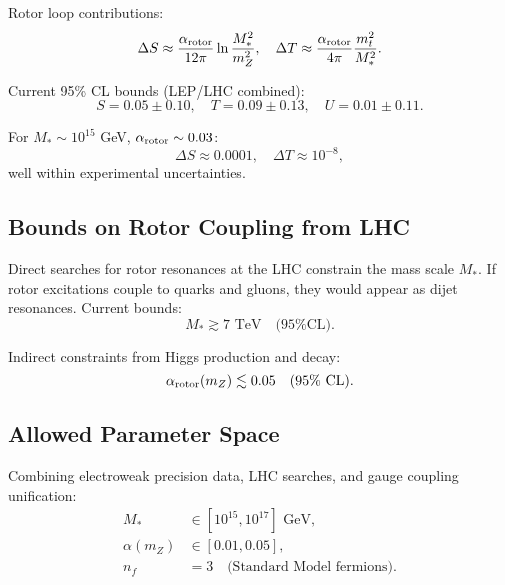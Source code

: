 \documentclass[11pt,a4paper]{article}
\numberwithin{equation}{section}
\theoremstyle{plain}
\theoremstyle{definition}
\theoremstyle{remark}
\begin{document}
Rotor loop contributions:
\begin{equation}
\Delta S \approx \frac{\alpha_{\rm rotor}}{12\pi}\ln\frac{M_*^2}{m_Z^2}, \quad \Delta T \approx \frac{\alpha_{\rm rotor}}{4\pi}\frac{m_t^2}{M_*^2}.
\label{eq:STU-rotor}
\end{equation}

Current 95\% CL bounds (LEP/LHC combined):
\begin{equation}
S = 0.05\pm 0.10, \quad T = 0.09\pm 0.13, \quad U = 0.01\pm 0.11.
\label{eq:STU-exp}
\end{equation}

For $M_*\sim 10^{15}$ GeV, $\alpha_{\rm rotor}\sim 0.03$:
\begin{equation}
\Delta S \approx 0.0001, \quad \Delta T \approx 10^{-8},
\label{eq:STU-rotor-value}
\end{equation}
well within experimental uncertainties.

\subsection{Bounds on Rotor Coupling from LHC}

Direct searches for rotor resonances at the LHC constrain the mass scale $M_*$. If rotor excitations couple to quarks and gluons, they would appear as dijet resonances. Current bounds:
\begin{equation}
M_* \gtrsim 7\text{ TeV} \quad\text{(95\% CL)}.
\label{eq:M-star-LHC}
\end{equation}

Indirect constraints from Higgs production and decay:
\begin{equation}
\alpha_{\rm rotor}(m_Z) \lesssim 0.05 \quad\text{(95\% CL)}.
\label{eq:alpha-LHC}
\end{equation}

\subsection{Allowed Parameter Space}

Combining electroweak precision data, LHC searches, and gauge coupling unification:
\begin{align}
M_* &\in [10^{15}, 10^{17}]\text{ GeV}, \label{eq:M-star-allowed}\\
\alpha(m_Z) &\in [0.01, 0.05], \label{eq:alpha-allowed}\\
n_f &= 3 \quad\text{(Standard Model fermions)}.
\label{eq:nf-allowed}
\end{align}
\end{document}
